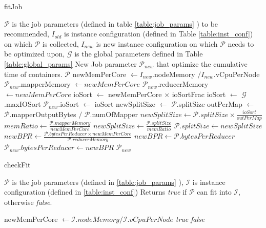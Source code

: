 \renewcommand{\algorithmicrequire}{\textbf{Input:}}
\renewcommand{\algorithmicensure}{\textbf{Output:}}
\renewcommand{\algorithmiccomment}[1]{// #1}
\begin{algorithm}
\caption{fitJob}\label{jobfit}
\begin{algorithmic}[1]
\footnotesize
\REQUIRE  $\mathcal{P}$ is the job parameters (defined in table \ref{table:job_params} ) to be recommended, $I_{old}$  is instance configuration (defined in Table \ref{table:inst_conf}) on which $\mathcal{P}$ is collected, $I_{new}$ is new instance configuration on which $\mathcal{P}$ needs to be optimized upon, $\mathcal{G}$ is the global parameters defined in Table \ref{table:global_params}
\ENSURE New Job parameter $\mathcal{P}_{new}$ that optimize the cumulative time of containers.
 \RETURN $\mathcal{P}$ 
\ENDIF
\STATE newMemPerCore $\gets I_{new}$.nodeMemory $/ I_{new}$.vCpuPerNode
\STATE $\mathcal{P}_{new}$.mapperMemory $\gets newMemPerCore$
\STATE $\mathcal{P}_{new}$.reducerMemory $\gets newMemPerCore$
\STATE ioSort $\gets$ newMemPerCore $\times$ ioSortFrac
\STATE ioSort $\gets$ $\mathcal{G}$.maxIOSort
\ENDIF
\STATE $\mathcal{P}_{new}$.ioSort $\gets$ ioSort
\STATE newSplitSize $\gets$ $\mathcal{P}$.splitSize
\STATE outPerMap $\gets$ $\mathcal{P}$.mapperOutputBytes $/$ $\mathcal{P}$.numOfMapper
\STATE $newSplitSize \gets \mathcal{P}.splitSize \times \frac{ioSort}{outPerMap}$
\STATE $memRatio \gets \frac{\mathcal{P}.mapperMemory}{newMemPerCore}$
\STATE $newSplitSize \gets \frac{\mathcal{P}.splitSize}{memRatio} $
\ENDIF
\STATE $\mathcal{P}.splitSize \gets newSplitSize$
\STATE $newBPR \gets \frac{\mathcal{P}.bytesPerReducer \times newMemPerCore}{\mathcal{P}.reducerMemory}$
\ELSE
\STATE $newBPR \gets \mathcal{P}.bytesPerReducer$
\ENDIF
\STATE $\mathcal{P}_{new}.bytesPerReducer \gets newBPR$
\STATE \RETURN $\mathcal{P}_{new}$
\end{algorithmic}
\end{algorithm}

\begin{algorithm}
\caption{checkFit} \label{checkfit}
\begin{algorithmic}[1]
\footnotesize
\REQUIRE $\mathcal{P}$ is the job parameters (defined in \ref{table:job_params} ), $\mathcal{I}$  is instance configuration (defined in \ref{table:inst_conf})
\ENSURE Returns \textit{true} if $\mathcal{P}$ can fit into $\mathcal{I}$, otherwise \textit{false}.

\STATE newMemPerCore $\gets \mathcal{I}.nodeMemory / \mathcal{I}.vCpuPerNode$
\RETURN \textit{true}
\ELSE
\RETURN \textit{false}
\ENDIF
\end{algorithmic}
\end{algorithm}

